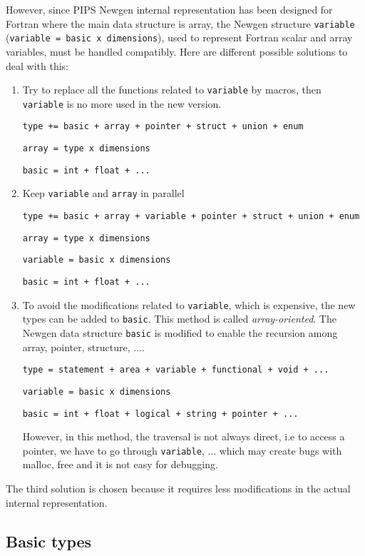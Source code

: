 \documentclass[a4paper]{article}
\begin{document}
However, since PIPS Newgen internal representation has been designed for
Fortran where the main data structure is array, the Newgen structure
\verb/variable/ (\verb/variable = basic x dimensions/), used to represent Fortran scalar and
array variables, must be handled compatibly. 
Here are different possible solutions to deal with this:
\begin{enumerate}
\item Try to replace all the functions related to \verb/variable/ by
  macros, then \verb/variable/ is no more used in the new version.

\verb/type += basic + array + pointer + struct + union + enum/

\verb/array = type x dimensions/

\verb/basic = int + float + .../
\item Keep \verb/variable/ and \verb/array/ in parallel 

\verb/type += basic + array + variable + pointer + struct + union + enum/

\verb/array = type x dimensions/

\verb/variable = basic x dimensions/

\verb/basic = int + float + .../

\item To avoid the modifications related to \verb/variable/, which is expensive, the new types
  can be added to \verb/basic/. This method is called {\it
  array-oriented}. The
Newgen data structure \verb/basic/ is modified to enable the recursion
among array, pointer, structure, .... 
  
\verb/type = statement + area + variable + functional + void + .../

\verb/variable = basic x dimensions /

\verb/basic = int + float + logical + string + pointer + .../

However, in this method, the traversal is not always direct, i.e to access a
pointer, we have to go through \verb/variable/, ... which may create 
bugs with malloc, free and it is not easy for debugging. 
\end{enumerate}
The third solution is chosen because it requires less modifications in
the actual internal representation. 
\subsection{Basic types}
\end{document}
